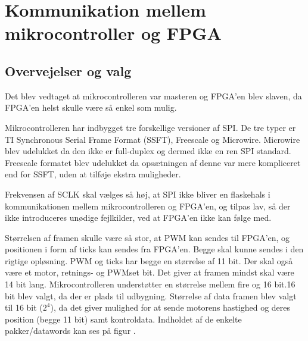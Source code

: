 \section{Kommunikation mellem mikrocontroller og FPGA}

\subsection{Overvejelser og valg}

Det blev vedtaget at mikrocontrolleren var masteren og FPGA'en blev slaven, da FPGA'en helst skulle være så enkel som mulig.

Mikrocontrolleren har indbygget tre forskellige versioner af SPI. De tre typer er TI Synchronous Serial Frame Format (SSFT), Freescale og Microwire. 
Microwire blev udelukket da den ikke er full-duplex og dermed ikke en ren SPI standard. 
Freescale formatet blev udelukket da opsætningen af denne var mere kompliceret end for SSFT, uden at tilføje ekstra muligheder. 

Frekvensen af SCLK skal vælges så høj, at SPI ikke bliver en flaskehals i kommunikationen mellem mikrocontrolleren og FPGA’en, og tilpas lav, så der ikke introduceres unødige fejlkilder, ved at FPGA’en ikke kan følge med.

Størrelsen af framen skulle være så stor, at PWM kan sendes til FPGA’en, og positionen i form af ticks kan sendes fra FPGA’en. Begge skal kunne sendes i den rigtige opløsning. PWM og ticks har begge en størrelse af 11 bit. Der skal også være et motor, retnings- og PWMset bit. Det giver at framen mindst skal være 14 bit lang. Mikrocontrolleren understøtter en størrelse mellem fire og 16 bit.16 bit blev valgt, da der er plads til udbygning.
Størrelse af data framen blev valgt til 16 bit ($2^4$), da det giver mulighed for at sende motorens hastighed og deres position (begge 11 bit) samt kontroldata. Indholdet af de enkelte pakker/datawords kan ses på figur \label{tb:protokol1}.

